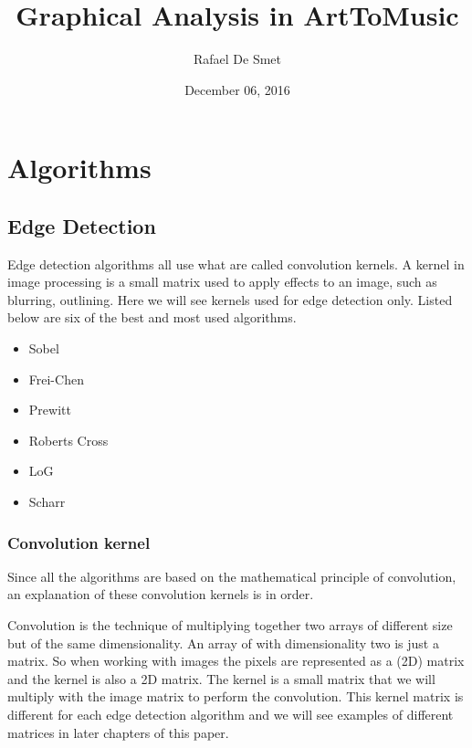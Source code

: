 \documentclass[12pt]{article}
\begin{document}
\title{Graphical Analysis in ArtToMusic}
\date{December 06, 2016}
\author{Rafael De Smet}

\maketitle
\tableofcontents
\section{Algorithms}

\subsection{Edge Detection}

Edge detection algorithms all use what are called convolution kernels. A kernel in image processing is a small matrix used to apply effects to an image, such as blurring, outlining. Here we will see kernels used for edge detection only. Listed below are six of the best and most used algorithms.

\begin{itemize}
        \item Sobel 
        \item Frei-Chen
        \item Prewitt
        \item Roberts Cross
        \item LoG
        \item Scharr
\end{itemize}

\subsubsection{Convolution kernel}

Since all the algorithms are based on the mathematical principle of convolution, an explanation of these convolution kernels is in order. 
\newline

Convolution is the technique of multiplying together two arrays of different size but of the same dimensionality. An array of with dimensionality two is just a matrix. So when working with images the pixels are represented as a (2D) matrix and the kernel is also a 2D matrix.
The kernel is a small matrix that we will multiply with the image matrix to perform the convolution. This kernel matrix is different for each edge detection algorithm and we will see examples of different matrices in later chapters of this paper. 
\newline
\end{document}
